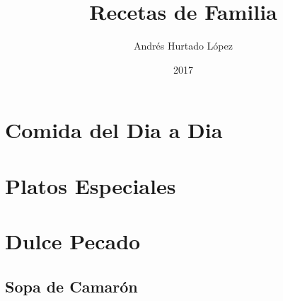 \documentclass[letterpaper]{book}
\begin{document}
\title{Recetas de Familia}
\author{Andrés Hurtado López}
\date{2017}

\frontmatter



\tableofcontents
\mainmatter
\part{Comida del Dia a Dia}
\part{Platos Especiales}
\part{Dulce Pecado}
\chapter{Sopa de Camarón}
\backmatter

\end{document}
